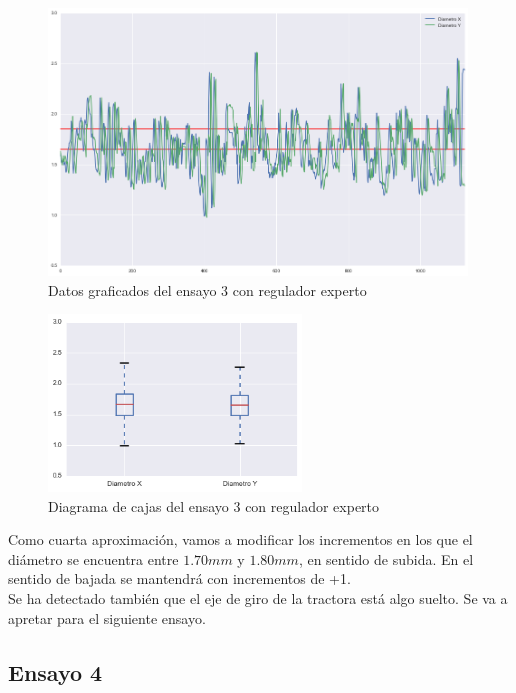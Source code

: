 \begin{figure}[H]
    \centering
    \includegraphics[width=0.99\textwidth]{images/producciones/12082015/output_9_e2.png}
    \caption{Datos graficados del ensayo 3 con regulador experto}
    \label{fig:reg_graf3}
\end{figure}

\begin{figure}[H]
    \centering
    \includegraphics[width=0.6\textwidth]{images/producciones/12082015/output_10_e2.png}
    \caption{Diagrama de cajas del ensayo 3 con regulador experto}
    \label{fig:reg_cajas3}
\end{figure}

Como cuarta  aproximación, vamos a  modificar los incrementos en los que el diámetro se encuentra entre $1.70 mm$ y $1.80 mm$, en sentido de subida. En el sentido de bajada se mantendrá con incrementos de +1.\\

Se ha detectado también que el eje de giro de la tractora está algo suelto. Se va a apretar para el siguiente ensayo.\\

\subsection{Ensayo 4}

